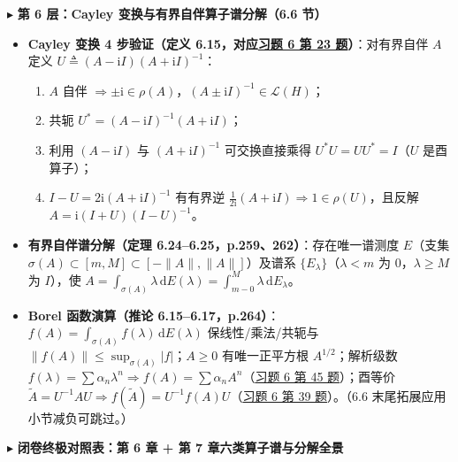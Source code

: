 \documentclass[11pt,a4paper]{article}
\providecommand{\tightlist}{\setlength{\itemsep}{1.8pt}\setlength{\parskip}{0pt}}
\newcommand{\SubSubHeading}[1]{%
  \Needspace{6.5\baselineskip}\vspace{5.5pt}\noindent
  \textcolor{AccentMain}{\scriptsize$\blacktriangleright$}\hspace{4pt}%
  {\small\bfseries\color{AccentMain}#1}\par\nopagebreak[4]\vspace{2.5pt}%
}
\begin{document}
\SubSubHeading{第 6 层：Cayley 变换与有界自伴算子谱分解（6.6 节）}

\begin{itemize}
\tightlist
\item
  \textbf{Cayley 变换 4 步验证（定义 6.15，对应\hyperlink{card:6-23}{\textcolor{LinkColor}{习题 6 第 23 题}}）}：对有界自伴 \(A\) 定义 \(U\triangleq(A-\mathrm{i}I)(A+\mathrm{i}I)^{-1}\)：

  \begin{enumerate}
  \def\labelenumi{\arabic{enumi}.}
  \tightlist
  \item
    \(A\) 自伴 \(\Rightarrow \pm\mathrm{i}\in\rho(A)\)，\((A\pm\mathrm{i}I)^{-1}\in\mathcal{L}(H)\)；
  \item
    共轭 \(U^*=(A-\mathrm{i}I)^{-1}(A+\mathrm{i}I)\)；
  \item
    利用 \((A-\mathrm{i}I)\) 与 \((A+\mathrm{i}I)^{-1}\) 可交换直接乘得 \(U^*U=UU^*=I\)（\(U\) 是酉算子）；
  \item
    \(I-U=2\mathrm{i}(A+\mathrm{i}I)^{-1}\) 有有界逆 \(\frac{1}{2\mathrm{i}}(A+\mathrm{i}I)\Rightarrow 1\in\rho(U)\)，且反解 \(A=\mathrm{i}(I+U)(I-U)^{-1}\)。
  \end{enumerate}
\item
  \textbf{有界自伴谱分解（定理 6.24--6.25，p.259、262）}：存在唯一谱测度 \(E\)（支集 \(\sigma(A)\subset[m,M]\subset[-\lVert A\rVert,\lVert A\rVert]\)）及谱系 \(\{E_\lambda\}\)（\(\lambda<m\) 为 \(0\)，\(\lambda\ge M\) 为 \(I\)），使 \(A=\int_{\sigma(A)}\lambda\,\mathrm{d}E(\lambda)=\int_{m-0}^M\lambda\,\mathrm{d}E_\lambda\)。
\item
  \textbf{Borel 函数演算（推论 6.15--6.17，p.264）}：\(f(A)=\int_{\sigma(A)}f(\lambda)\,\mathrm{d}E(\lambda)\) 保线性/乘法/共轭与 \(\lVert f(A)\rVert\le\sup_{\sigma(A)}\lvert f\rvert\)；\(A\ge 0\) 有唯一正平方根 \(A^{1/2}\)；解析级数 \(f(\lambda)=\sum\alpha_n\lambda^n\Rightarrow f(A)=\sum\alpha_n A^n\)（\hyperlink{card:6-45}{\textcolor{LinkColor}{习题 6 第 45 题}}）；酉等价 \(\tilde{A}=U^{-1}AU\Rightarrow f(\tilde{A})=U^{-1}f(A)U\)（\hyperlink{card:6-39}{\textcolor{LinkColor}{习题 6 第 39 题}}）。（6.6 末尾拓展应用小节减负可跳过。）
\end{itemize}

\SubSubHeading{闭卷终极对照表：第 6 章 + 第 7 章六类算子谱与分解全景}
\end{document}
